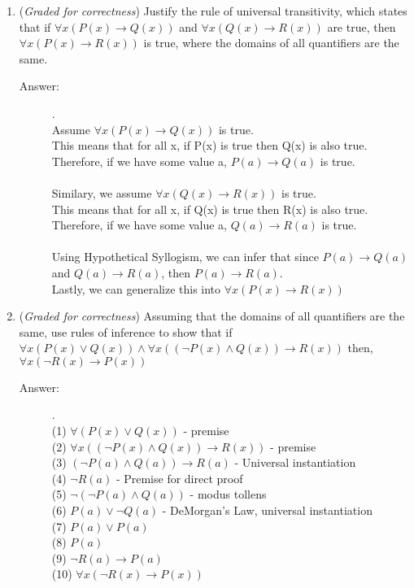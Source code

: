 \documentclass[12pt, oneside]{article}
\begin{document}
\begin{enumerate}
\item({\it Graded for correctness}) Justify the rule of universal transitivity, which states that if $\forall x(P(x) \to Q(x))$ and $\forall x(Q(x) \to R(x))$ are true, then $\forall x(P(x)\to R(x))$ is true, where the domains of all quantifiers are the same.
\begin{description}
    \item[Answer:] .\\
    Assume $\forall x (P(x) \rightarrow Q(x))$ is true.\\
    This means that for all x, if P(x) is true then Q(x) is also true.\\
    Therefore, if we have some value a, $P(a) \rightarrow Q(a)$ is true.\\\\
    Similary, we assume $\forall x (Q(x) \rightarrow R(x))$ is true.\\
    This means that for all x, if Q(x) is true then R(x) is also true.\\
    Therefore, if we have some value a, $Q(a) \rightarrow R(a)$ is true.\\\\
    Using Hypothetical Syllogism, we can infer that since $P(a) \rightarrow Q(a)$ and $Q(a) \rightarrow R(a)$, then $P(a) \rightarrow R(a)$.\\
    Lastly, we can generalize this into $\forall x (P(x) \rightarrow R(x))$
\end{description}

\item ({\it Graded for correctness}) Assuming that the domains of all quantifiers are the same, use rules of inference to show that if $
\forall x(P(x)\lor Q(x))  \land \forall x((\neg P(x)\land Q(x)) \to R(x))
$ then, $\forall x(\neg R(x) \to P(x))$ \\

\begin{description}
    \item[Answer:] .\\
    (1) $\forall (P(x) \lor Q(x))$ - premise\\
    (2) $\forall x ((\lnot P(x) \land Q(x)) \rightarrow R(x))$ - premise\\
    (3) $(\lnot P(a) \land Q(a)) \rightarrow R(a)$ - Universal instantiation\\
    (4) $\lnot R(a)$ - Premise for direct proof\\
    (5) $\lnot (\lnot P(a) \land Q(a))$ - modus tollens\\
    (6) $P(a) \lor \lnot Q(a)$ - DeMorgan's Law, universal instantiation\\
    (7) $P(a) \lor P(a)$\\
    (8) $P(a)$\\
    (9) $\lnot R(a) \rightarrow P(a)$\\
    (10) $\forall x (\lnot R(x) \rightarrow P(x))$
\end{description}







\end{enumerate}
\end{document}
